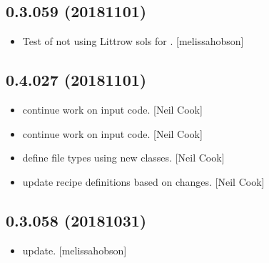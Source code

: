 \documentclass[a4paper,10pt,english]{report}
\begin{document}
\subsection{0.3.059 (2018\sphinxhyphen{}11\sphinxhyphen{}01)}
\label{\detokenize{misc/changelog:id292}}\begin{itemize}
\item {} 
Test of not using Littrow sols for . {[}melissa\sphinxhyphen{}hobson{]}

\end{itemize}


\subsection{0.4.027 (2018\sphinxhyphen{}11\sphinxhyphen{}01)}
\label{\detokenize{misc/changelog:id293}}\begin{itemize}
\item {} 
 \sphinxhyphen{} continue work on input code. {[}Neil Cook{]}

\item {} 
 \sphinxhyphen{} continue work on input code. {[}Neil Cook{]}

\item {} 
 \sphinxhyphen{} define file types using new classes. {[}Neil Cook{]}

\item {} 
 \sphinxhyphen{} update recipe definitions based on changes. {[}Neil Cook{]}

\end{itemize}


\subsection{0.3.058 (2018\sphinxhyphen{}10\sphinxhyphen{}31)}
\label{\detokenize{misc/changelog:id294}}\begin{itemize}
\item {} 
 update. {[}melissa\sphinxhyphen{}hobson{]}

\end{itemize}
\end{document}
